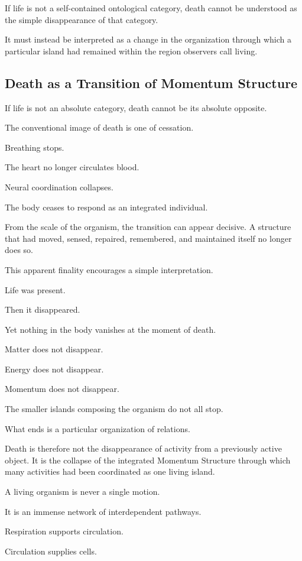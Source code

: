 If life is not a self-contained ontological category, death cannot be understood as the simple disappearance of that category.

It must instead be interpreted as a change in the organization through which a particular island had remained within the region observers call living.

\subsection*{\textbf{Death as a Transition of Momentum Structure}} 

If life is not an absolute category, death cannot be its absolute opposite.

The conventional image of death is one of cessation.

Breathing stops.

The heart no longer circulates blood.

Neural coordination collapses.

The body ceases to respond as an integrated individual.

From the scale of the organism, the transition can appear decisive. A structure that had moved, sensed, repaired, remembered, and maintained itself no longer does so.

This apparent finality encourages a simple interpretation.

Life was present.

Then it disappeared.

Yet nothing in the body vanishes at the moment of death.

Matter does not disappear.

Energy does not disappear.

Momentum does not disappear.

The smaller islands composing the organism do not all stop.

What ends is a particular organization of relations.

Death is therefore not the disappearance of activity from a previously active object. It is the collapse of the integrated Momentum Structure through which many activities had been coordinated as one living island.

A living organism is never a single motion.

It is an immense network of interdependent pathways.

Respiration supports circulation.

Circulation supplies cells.

